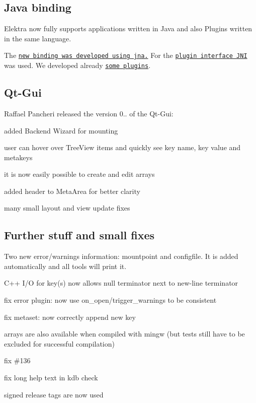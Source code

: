 \subsection*{Java binding}

Elektra now fully supports applications written in Java and also Plugins written in the same language.

The \href{https://github.com/ElektraInitiative/libelektra/tree/master/src/bindings/jna}{\tt new binding was developed using jna.} For the \href{https://github.com/ElektraInitiative/libelektra/tree/master/src/plugins/jni}{\tt plugin interface J\+NI} was used. We developed already \href{https://master.libelektra.org/src/bindings/jna/libelektra4j/src/main/java/org/libelektra/plugin}{\tt some plugins}.

\subsection*{Qt-\/\+Gui}

Raffael Pancheri released the version 0.. of the Qt-\/\+Gui\+:


\begin{DoxyItemize}
\item added Backend Wizard for mounting
\item user can hover over Tree\+View items and quickly see key name, key value and metakeys
\item it is now easily possible to create and edit arrays
\item added header to Meta\+Area for better clarity
\item many small layout and view update fixes
\end{DoxyItemize}

\subsection*{Further stuff and small fixes}


\begin{DoxyItemize}
\item Two new error/warnings information\+: mountpoint and configfile. It is added automatically and all tools will print it.
\item C++ I/O for key(s) now allows null terminator next to new-\/line terminator
\item fix error plugin\+: now use {\ttfamily on\+\_\+open}/{\ttfamily trigger\+\_\+warnings} to be consistent
\item fix metaset\+: now correctly append new key
\item arrays are also available when compiled with mingw (but tests still have to be excluded for successful compilation)
\item fix \#136
\item fix long help text in {\ttfamily kdb check}
\item signed release tags are now used
\end{DoxyItemize}

